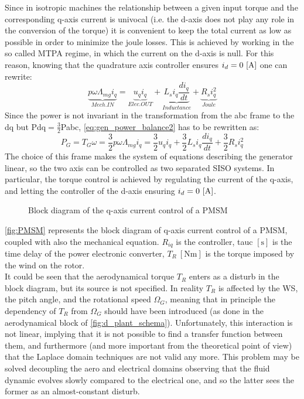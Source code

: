 Since in isotropic machines the relationship between a given input torque and the corresponding q-axis current is univocal (i.e. the d-axis does not play any role in the conversion of the torque) it is convenient to keep the total current as low as possible in order to minimize the joule losses. This is achieved by working in the so called \acrfull{MTPA} regime, in which the current on the d-axis is null. For this reason, knowing that the quadrature axis controller ensures $i_d=0 \, \left[\si{\ampere}\right]$ one can rewrite:
\begin{equation}
  \underbrace{p\omega\Lambda_{mg}i_q}_{Mech. IN} = \underbrace{u_qi_q}_{Elec. OUT}+ \underbrace{L_{s} i_q\frac{di_q}{dt}}_{Inductance} + \underbrace{R_{s}i_q^2}_{Joule}
  \label{eq:gen_power_balance2}
\end{equation}
Since the power is not invariant in the transformation from the abc frame to the dq but \acrshort{Pdq}$= \frac{3}{2}$\acrshort{Pabc}, \autoref{eq:gen_power_balance2} has to be rewritten as:
\begin{equation}
  P_G = T_G\omega = \frac{3}{2}p\omega\Lambda_{mg}i_q = \frac{3}{2}u_qi_q + \frac{3}{2}L_{s} i_q\frac{di_q}{dt} + \frac{3}{2}R_{s} i_q^2
  \label{eq:gen_power_balance3}
\end{equation}
The choice of this frame makes the system of equations describing the generator linear, so the two axis can be controlled as two separated \acrfull{SISO} systems. In particular, the torque control is achieved by regulating the current of the q-axis, and letting the controller of the d-axis ensuring $i_d=0 \, \left[\si{\ampere}\right]$.
\begin{figure}[htb]

\caption{Block diagram of the q-axis current control of a PMSM}
\label{fig:PMSM}
\end{figure}

\autoref{fig:PMSM} represents the block diagram of q-axis current control of a \acrshort{PMSM}, coupled with also the mechanical equation. $R_{iq}$ is the controller, \acrshort{tauc} $\left[\si{\second}\right]$ is the time delay of the power electronic converter, $T_R \ \left[\si{\newton\meter}\right]$ is the torque imposed by the wind on the rotor.\\
It could be seen that the aerodynamical torque $T_R$ enters as a disturb in the block diagram, but its source is not specified. In reality $T_R$ is affected by the \acrshort{WS}, the pitch angle, and the rotational speed $\Omega_G$, meaning that in principle the dependency of $T_R$ from $\Omega_G$ should have been introduced (as done in the aerodynamical block of \autoref{fig:d_plant_schema}). Unfortunately, this interaction is not linear, implying that it is not possible to find a transfer function between them, and furthermore (and more important from the theoretical point of view) that the Laplace domain techniques are not valid any more. This problem may be solved decoupling the aero and electrical domains observing that the fluid dynamic evolves slowly compared to the electrical one, and so the latter sees the former as an almost-constant disturb. 

